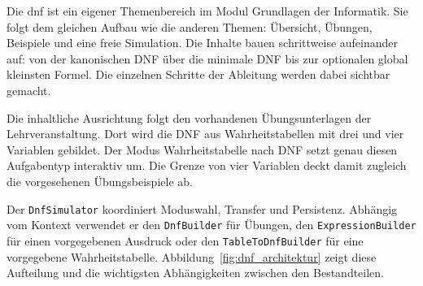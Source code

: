  \label{4_6_DNF}

Die \gls{dnf} ist ein eigener Themenbereich im Modul
\glqq Grundlagen der Informatik\grqq{}. Sie folgt dem gleichen Aufbau wie die anderen
Themen: Übersicht, Übungen, Beispiele und eine freie Simulation. Die Inhalte bauen
schrittweise aufeinander auf: von der kanonischen DNF über die minimale DNF bis zur
optionalen global kleinsten Formel. Die einzelnen Schritte der Ableitung werden dabei
sichtbar gemacht.

Die inhaltliche Ausrichtung folgt den vorhandenen Übungsunterlagen der Lehrveranstaltung.
Dort wird die DNF aus Wahrheitstabellen mit drei und vier Variablen gebildet. Der Modus
\glqq Wahrheitstabelle nach DNF\grqq{} setzt genau diesen Aufgabentyp interaktiv um. Die
Grenze von vier Variablen deckt damit zugleich die vorgesehenen Übungsbeispiele ab.


Der \texttt{DnfSimulator} koordiniert Moduswahl, Transfer und Persistenz. Abhängig vom
Kontext verwendet er den \texttt{DnfBuilder} für Übungen, den
\texttt{ExpressionBuilder} für einen vorgegebenen Ausdruck oder den
\texttt{TableToDnfBuilder} für eine vorgegebene Wahrheitstabelle.
Abbildung~\ref{fig:dnf_architektur} zeigt diese Aufteilung und die wichtigsten
Abhängigkeiten zwischen den Bestandteilen.

